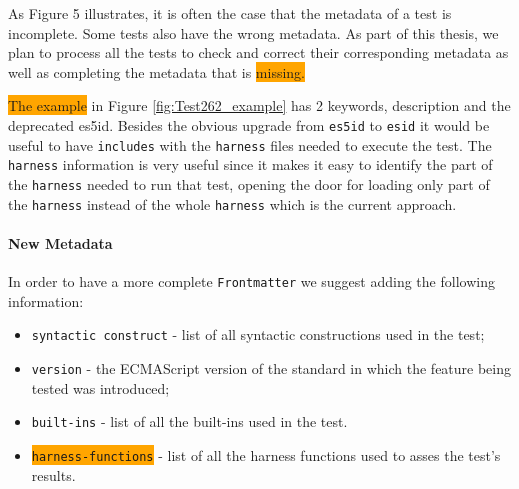 \documentclass[runningheads]{llncs}
\begin{document}
As Figure 5 illustrates, it is often the case that the metadata of a test is incomplete. Some tests also have the wrong metadata. As part of this thesis, we plan to process all the tests to check and correct their corresponding metadata as well as completing the metadata that is \colorbox{orange}{missing.}


\colorbox{orange}{The example} in Figure \ref{fig:Test262_example} has 2 keywords, description and the deprecated es5id. Besides the obvious upgrade from \texttt{es5id} to \texttt{esid} it would be useful to have \texttt{includes} with the \texttt{harness} files needed to execute the test. The \texttt{harness} information is very useful since it makes it easy to identify the part of the \texttt{harness} needed to run that test, opening the door for loading only part of the \texttt{harness} instead of the whole \texttt{harness} which is the current approach.



\paragraph{New Metadata}
In order to have a more complete \texttt{Frontmatter} we suggest adding the following information:

\begin{itemize}
    \item \texttt{syntactic construct} - list of all syntactic constructions used in the test;
    \item \texttt{version} - the ECMAScript version of the standard in which the feature being tested was introduced;
    \item \texttt{built-ins} - list of all the built-ins used in the test.
    \item \colorbox{orange}{\texttt{harness-functions}} - list of all the harness functions used to asses the test's results.
\end{itemize}
\end{document}
